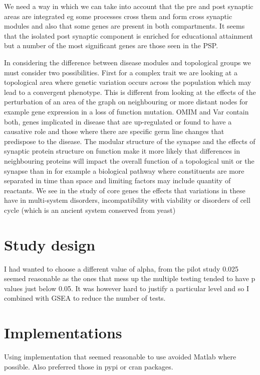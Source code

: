 We need a way in which we can take into account that the pre and post synaptic areas are integrated eg some processes cross them and form cross synaptic modules and also that some genes are present in both compartments. It seems that the isolated post synaptic component is enriched for educational attainment but a number of the most significant genes are those seen in the PSP.

In considering the difference between disease modules and topological groups we must consider two possibilities. First for a complex trait we are looking at a topological area where genetic variation occurs across the population which may lead to a convergent phenotype. This is different from looking at the effects of the perturbation of an area of the graph on neighbouring or more distant nodes for example gene expression in a loss of function mutation. OMIM and Var contain both, genes implicated in disease that are up-regulated or found to have a causative role and those where there are specific germ line changes that predispose to the disease. The modular structure of the synapse and the effects of synaptic protein structure on function make it more likely that differences in neighbouring proteins will impact the overall function of a topological unit or the synapse than in for example a biological pathway where constituents are more separated in time than space and limiting factors may include quantity of reactants. We see in the study of core genes the effects that variations in these have in multi-system disorders, incompatibility with viability or disorders of cell cycle (which is an ancient system conserved from yeast)

\section{Study design}
I had wanted to choose a different value of alpha, from the pilot study 0.025 seemed reasonable as the ones that mess up the multiple testing tended to have p values just below 0.05. It was however hard to justify a particular level and so I combined with GSEA to reduce the number of tests. 



\section{Implementations}

Using implementation that seemed reasonable to use avoided Matlab where possible. Also preferred those in pypi or cran packages. 


